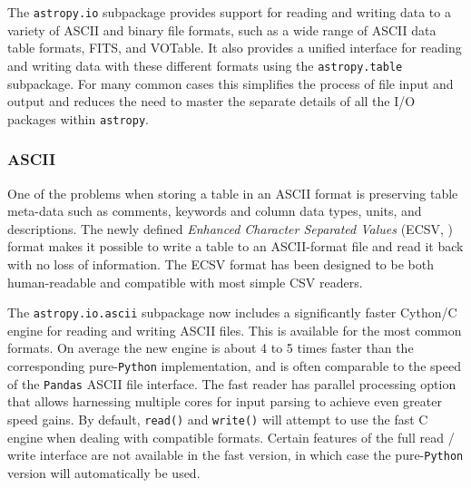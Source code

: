 \documentclass[modern]{aastex61}
\newcommand{\package}[1]{\texttt{#1}\xspace}
\newcommand{\python}{\package{Python}}
\newcommand{\astropypkg}{\package{astropy}}
\newcommand{\inlinecomment}[2]{\todo[inline]{#1: #2}\xspace}
\begin{document}
The \package{astropy.io} subpackage provides support for reading and writing
data to a variety of ASCII and binary file formats, such as a wide range of
ASCII data table formats, FITS, and VOTable.
It also provides a unified interface for reading and writing data with these
different formats using the \package{astropy.table} subpackage.
For many common cases this simplifies the process of file input and output and
reduces the need to master the separate details of all the I/O packages within
\astropypkg.






\subsubsection{ASCII}

One of the problems when storing a table in an ASCII format is
preserving table meta-data such as comments, keywords and column data
types, units, and descriptions. The newly defined \emph{Enhanced
Character Separated Values} (ECSV,  \citealt{ape6}) format makes it
possible to write a table to an ASCII-format file and read it back
with no loss of information. The ECSV format has been designed to be
both human-readable and compatible with most simple CSV readers.


The \package{astropy.io.ascii} subpackage now includes a significantly faster
Cython/C engine for reading and writing ASCII files. This is available for the
most common formats.  On average the new engine is about 4 to 5 times faster
than the corresponding pure-\python implementation, and is often comparable to
the speed of the \package{Pandas} \citep{pandas} ASCII file interface.  The
fast reader has parallel processing option that allows harnessing multiple
cores for input parsing to achieve even greater speed gains.  By default,
\texttt{read()} and \texttt{write()} will attempt to use the fast C engine
when dealing with compatible formats. Certain features of the full read
/ write interface are not available in the fast version, in which case the
pure-\python version will automatically be used.
\end{document}
